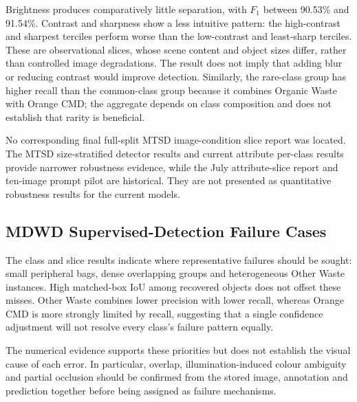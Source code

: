Brightness produces comparatively little separation, with \(F_1\) between 90.53\% and 91.54\%. Contrast and sharpness show a less intuitive pattern: the high-contrast and sharpest terciles perform worse than the low-contrast and least-sharp terciles. These are observational slices, whose scene content and object sizes differ, rather than controlled image degradations. The result does not imply that adding blur or reducing contrast would improve detection. Similarly, the rare-class group has higher recall than the common-class group because it combines Organic Waste with Orange CMD; the aggregate depends on class composition and does not establish that rarity is beneficial.

No corresponding final full-split MTSD image-condition slice report was located. The MTSD size-stratified detector results and current attribute per-class results provide narrower robustness evidence, while the July attribute-slice report and ten-image prompt pilot are historical. They are not presented as quantitative robustness results for the current models.


\subsection{MDWD Supervised-Detection Failure Cases}
\label{sec:ev-mdwd-failures}
The class and slice results indicate where representative failures should be sought: small peripheral bags, dense overlapping groups and heterogeneous Other Waste instances. High matched-box \gls{IoU} among recovered objects does not offset these misses. Other Waste combines lower precision with lower recall, whereas Orange CMD is more strongly limited by recall, suggesting that a single confidence adjustment will not resolve every class's failure pattern equally.

The numerical evidence supports these priorities but does not establish the visual cause of each error. In particular, overlap, illumination-induced colour ambiguity and partial occlusion should be confirmed from the stored image, annotation and prediction together before being assigned as failure mechanisms.


